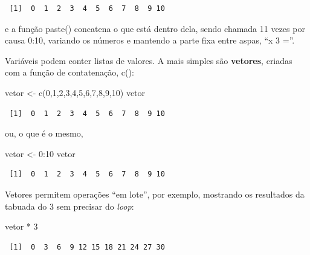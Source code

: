 \documentclass[
]{article}
\newenvironment{Shaded}{\begin{snugshade}}{\end{snugshade}}
\newcommand{\DecValTok}[1]{\textcolor[rgb]{0.00,0.00,0.81}{#1}}
\newcommand{\FunctionTok}[1]{\textcolor[rgb]{0.00,0.00,0.00}{#1}}
\newcommand{\NormalTok}[1]{#1}
\newcommand{\OtherTok}[1]{\textcolor[rgb]{0.56,0.35,0.01}{#1}}
\newcommand{\SpecialCharTok}[1]{\textcolor[rgb]{0.00,0.00,0.00}{#1}}
\begin{document}
\begin{verbatim}
 [1]  0  1  2  3  4  5  6  7  8  9 10
\end{verbatim}

e a função paste() concatena o que está dentro dela, sendo chamada 11
vezes por causa 0:10, variando os números e mantendo a parte fixa entre
aspas, ``x 3 =''.

Variáveis podem conter listas de valores. A mais simples são
\textbf{vetores}, criadas com a função de contatenação, c():

\begin{Shaded}
\begin{Highlighting}[]
\NormalTok{vetor }\OtherTok{\textless{}{-}} \FunctionTok{c}\NormalTok{(}\DecValTok{0}\NormalTok{,}\DecValTok{1}\NormalTok{,}\DecValTok{2}\NormalTok{,}\DecValTok{3}\NormalTok{,}\DecValTok{4}\NormalTok{,}\DecValTok{5}\NormalTok{,}\DecValTok{6}\NormalTok{,}\DecValTok{7}\NormalTok{,}\DecValTok{8}\NormalTok{,}\DecValTok{9}\NormalTok{,}\DecValTok{10}\NormalTok{)}
\NormalTok{vetor}
\end{Highlighting}
\end{Shaded}

\begin{verbatim}
 [1]  0  1  2  3  4  5  6  7  8  9 10
\end{verbatim}

ou, o que é o mesmo,

\begin{Shaded}
\begin{Highlighting}[]
\NormalTok{vetor }\OtherTok{\textless{}{-}} \DecValTok{0}\SpecialCharTok{:}\DecValTok{10}
\NormalTok{vetor}
\end{Highlighting}
\end{Shaded}

\begin{verbatim}
 [1]  0  1  2  3  4  5  6  7  8  9 10
\end{verbatim}

Vetores permitem operações ``em lote'', por exemplo, mostrando os
resultados da tabuada do 3 sem precisar do \emph{loop}:

\begin{Shaded}
\begin{Highlighting}[]
\NormalTok{vetor }\SpecialCharTok{*} \DecValTok{3}
\end{Highlighting}
\end{Shaded}

\begin{verbatim}
 [1]  0  3  6  9 12 15 18 21 24 27 30
\end{verbatim}
\end{document}
